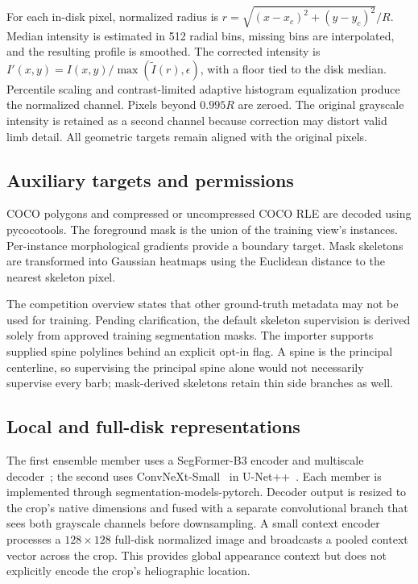 \documentclass[conference]{IEEEtran}
\begin{document}
For each in-disk pixel, normalized radius is
$r=\sqrt{(x-x_c)^2+(y-y_c)^2}/R$. Median intensity is estimated in 512 radial bins, missing bins are interpolated, and the resulting profile is smoothed. The corrected intensity is $I'(x,y)=I(x,y)/\max(\widetilde I(r),\epsilon)$, with a floor tied to the disk median. Percentile scaling and contrast-limited adaptive histogram equalization produce the normalized channel. Pixels beyond $0.995R$ are zeroed. The original grayscale intensity is retained as a second channel because correction may distort valid limb detail. All geometric targets remain aligned with the original pixels.

\subsection{Auxiliary targets and permissions}
COCO polygons and compressed or uncompressed COCO RLE are decoded using pycocotools. The foreground mask is the union of the training view's instances. Per-instance morphological gradients provide a boundary target. Mask skeletons are transformed into Gaussian heatmaps using the Euclidean distance to the nearest skeleton pixel.

The competition overview states that other ground-truth metadata may not be used for training. Pending clarification, the default skeleton supervision is derived solely from approved training segmentation masks. The importer supports supplied spine polylines behind an explicit opt-in flag. A spine is the principal centerline, so supervising the principal spine alone would not necessarily supervise every barb; mask-derived skeletons retain thin side branches as well.

\subsection{Local and full-disk representations}
The first ensemble member uses a SegFormer-B3 encoder and multiscale decoder~\cite{segformer}; the second uses ConvNeXt-Small~\cite{convnext} in U-Net++~\cite{unetpp}. Each member is implemented through segmentation-models-pytorch. Decoder output is resized to the crop's native dimensions and fused with a separate convolutional branch that sees both grayscale channels before downsampling. A small context encoder processes a $128\times128$ full-disk normalized image and broadcasts a pooled context vector across the crop. This provides global appearance context but does not explicitly encode the crop's heliographic location.
\end{document}
